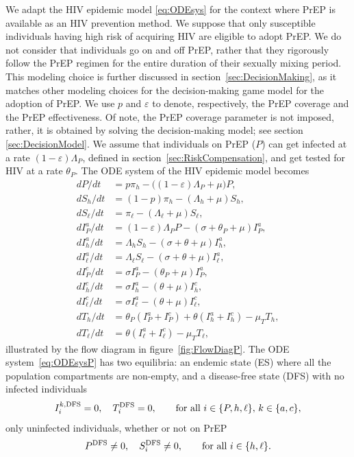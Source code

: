 \documentclass[11pt]{article}
\begin{document}
We adapt the HIV epidemic model \eqref{eq:ODEsys} for the context where PrEP is available as an HIV prevention method. We suppose that only susceptible individuals having high risk of acquiring HIV are eligible to adopt PrEP. We do not consider that individuals go on and off PrEP, rather that they rigorously follow the PrEP regimen for the entire duration of their sexually mixing period. This modeling choice is further discussed in section~\ref{sec:DecisionMaking}, as it matches other modeling choices for the decision-making game model for the adoption of PrEP. We use $p$ and $\varepsilon$ to denote, respectively, the PrEP coverage and the PrEP effectiveness. Of note, the PrEP coverage parameter is not imposed, rather, it is obtained by solving the decision-making model; see section \ref{sec:DecisionModel}. We assume that individuals on PrEP ($P$) can get infected at a rate $(1-\varepsilon)\Lambda_P$, defined in section~\ref{sec:RiskCompensation}, and get tested for HIV at a rate $\theta_P$. The ODE system of the HIV epidemic model becomes
\begin{equation} \label{eq:ODEsysP} 
\begin{aligned}
        dP/dt 		& = p \pi_h - \Big( (1-\varepsilon) \Lambda_P + \mu \Big) P, \\
        dS_h/dt 		& = (1-p) \pi_h - \left( \Lambda_h + \mu \right) S_h, \\ 
        dS_\ell/dt 		& = \pi_\ell - \left( \Lambda_\ell + \mu \right) S_\ell, \\ 
        dI_P^a/dt		& = (1-\varepsilon) \Lambda_P P - \left(\sigma + \theta_P + \mu \right) I_P^a, \\
        dI_h^a/dt 		& = \Lambda_h S_h - \left( \sigma + \theta + \mu \right) I_h^a, \\
        dI_\ell^a/dt 	& = \Lambda_\ell S_\ell - \left( \sigma + \theta + \mu \right) I_\ell^a, \\
        dI_P^c/dt 		& = \sigma I_P^a - \left( \theta_P + \mu \right) I_P^a,\\
        dI_h^c/dt 		& = \sigma I_h^a - (\theta +\mu) I_h^c, \\
        dI_\ell^c/dt 	& = \sigma I_\ell^a - (\theta +\mu) I_\ell^c, \\
        dT_h/dt 		& = \theta_P \left( I_P^a + I_P^c\right) + \theta \left(I_h^a + I_h^c \right) - \mu_T T_h, \\
        dT_\ell/dt 		& = \theta \left(I_\ell^a + I_\ell^c\right) - \mu_T T_\ell,
\end{aligned}
\end{equation}
illustrated by the flow diagram in figure~\ref{fig:FlowDiagP}. The ODE system~\eqref{eq:ODEsysP} has two equilibria: an endemic state (ES) where all the population compartments are non-empty, and a disease-free state (DFS) with no infected individuals
\begin{equation}
	I_i^{k,\rm DFS} = 0,\quad T_i^{\rm DFS} = 0, \qquad \text{for all } i\in\{P,h,\ell\}, \, k\in\{a,c\},
\end{equation}
only uninfected individuals, whether or not on PrEP
\begin{equation}
	P^{\rm DFS}\neq 0,\quad S_i^{\rm DFS}\neq 0, \qquad \text{for all } i\in\{h,\ell\}.
\end{equation}
\end{document}
